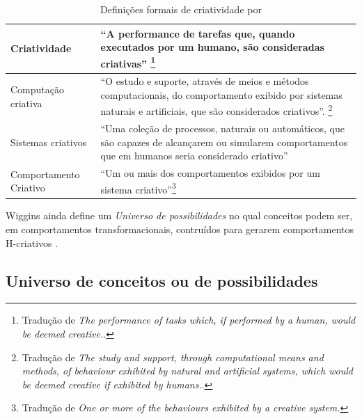 \begin{table}
\caption{Definições formais de criatividade por }
\small
    \begin{tabular}{ | p{4cm} | p{11.25cm} |}
    \hline 
    \hline 

    \tiny{Criatividade} 
    & \tiny{``A performance de tarefas que, quando executados por um humano, são consideradas criativas''  \footnote{Tradução de \emph{The performance of tasks which, if performed by a human, would be deemed creative.}.}} \\
    \hline

    \tiny{Computação criativa} 
    & \tiny{``O estudo e suporte, através de meios e métodos computacionais, do comportamento exibido por sistemas naturais e artificiais, que são considerados criativos''. \footnote{Tradução de \emph{The study and support, through computational means and methods, of behaviour exhibited by natural and artificial systems, which would be deemed creative if exhibited by humans.}.}} \\
    \hline

    \tiny{Sistemas criativos} 
    & \tiny{``Uma coleção de processos, naturais ou automáticos, que são capazes de alcançarem ou simularem comportamentos que em humanos seria considerado criativo''} \\
    \hline

    \tiny{Comportamento Criativo} 
    & \tiny{``Um ou mais dos comportamentos exibidos por um sistema criativo''\footnote{Tradução de \emph{One or more of the behaviours exhibited by a creative system.}}} \\
    \hline
   
    \end{tabular}
\label{tab:criatividade}
\end{table}

Wiggins ainda define um \emph{Universo de possibilidades} no qual conceitos podem ser, em comportamentos transformacionais, contruídos para gerarem comportamentos H-criativos .

\subsection{Universo de conceitos ou de possibilidades}

